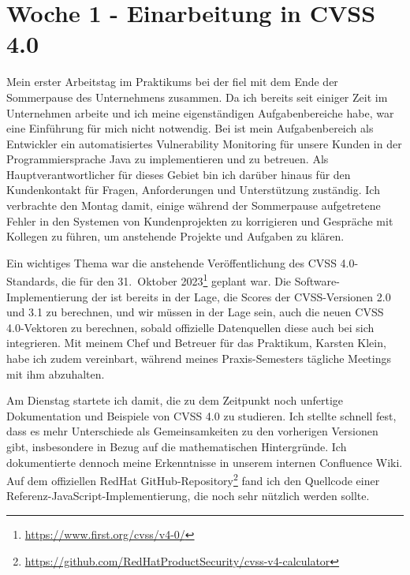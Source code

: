 \section{Woche 1 - Einarbeitung in CVSS 4.0} \label{sec:bericht-wo-1}


\lweekdaymarginpar{\weekdayMondayLong}

Mein erster Arbeitstag im Praktikums bei der {\metaeffekt} fiel mit dem Ende der Sommerpause des Unternehmens zusammen.
Da ich bereits seit einiger Zeit im Unternehmen arbeite und ich meine eigenständigen Aufgabenbereiche habe, war eine Einführung für mich nicht notwendig.
Bei {\metaeffekt} ist mein Aufgabenbereich als Entwickler ein automatisiertes Vulnerability Monitoring für unsere Kunden in der Programmiersprache Java zu implementieren und zu betreuen.
Als Hauptverantwortlicher für dieses Gebiet bin ich darüber hinaus für den Kundenkontakt für Fragen, Anforderungen und Unterstützung zuständig.
Ich verbrachte den Montag damit, einige während der Sommerpause aufgetretene Fehler in den Systemen von Kundenprojekten zu korrigieren und Gespräche mit Kollegen zu führen, um anstehende Projekte und Aufgaben zu klären.

Ein wichtiges Thema war die anstehende Veröffentlichung des CVSS 4.0-Standards, die für den 31.\ Oktober 2023\footnote{\url{https://www.first.org/cvss/v4-0/}} geplant war.
Die Software-Implementierung der {\metaeffekt} ist bereits in der Lage, die Scores der CVSS-Versionen 2.0 und 3.1 zu berechnen, und wir müssen in der Lage sein, auch die neuen CVSS 4.0-Vektoren zu berechnen, sobald offizielle Datenquellen diese auch bei sich integrieren.
Mit meinem Chef und Betreuer für das Praktikum, Karsten Klein, habe ich zudem vereinbart, während meines Praxis-Semesters tägliche Meetings mit ihm abzuhalten.

\sweekdaymarginpar{\weekdayTuesdayLong}

Am Dienstag startete ich damit, die zu dem Zeitpunkt noch unfertige Dokumentation und Beispiele von CVSS 4.0 zu studieren.
Ich stellte schnell fest, dass es mehr Unterschiede als Gemeinsamkeiten zu den vorherigen Versionen gibt, insbesondere in Bezug auf die mathematischen Hintergründe.
Ich dokumentierte dennoch meine Erkenntnisse in unserem internen Confluence Wiki.
Auf dem offiziellen RedHat GitHub-Repository\footnote{\url{https://github.com/RedHatProductSecurity/cvss-v4-calculator}} fand ich den Quellcode einer Referenz-JavaScript-Implementierung, die noch sehr nützlich werden sollte.


